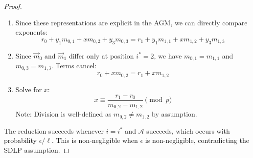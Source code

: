 \begin{proof}
\begin{enumerate}
\begin{enumerate}
        \item Since these representations are explicit in the AGM, we can directly compare exponents:
        \[
            r_0 + y_1m_{0,1} + xm_{0,2} + y_3m_{0,3} = r_1 + y_1m_{1,1} + xm_{1,2} + y_3m_{1,3}
        \]
        
        \item Since $\vec{m}_0$ and $\vec{m}_1$ differ only at position $i^*=2$, we have $m_{0,1}=m_{1,1}$ and $m_{0,3}=m_{1,3}$. Terms cancel:
        \[
            r_0 + xm_{0,2} = r_1 + xm_{1,2}
        \]
        
        \item Solve for $x$:
        \[
            x \equiv \frac{r_1-r_0}{m_{0,2}-m_{1,2}} \pmod{p}
        \]
        Note: Division is well-defined as $m_{0,2} \neq m_{1,2}$ by assumption.
    \end{enumerate}
\end{enumerate}

The reduction succeeds whenever $i = i^*$ and $\mathcal{A}$ succeeds, which occurs with probability $\epsilon/\ell$. This is non-negligible when $\epsilon$ is non-negligible, contradicting the SDLP assumption.
\end{proof}


